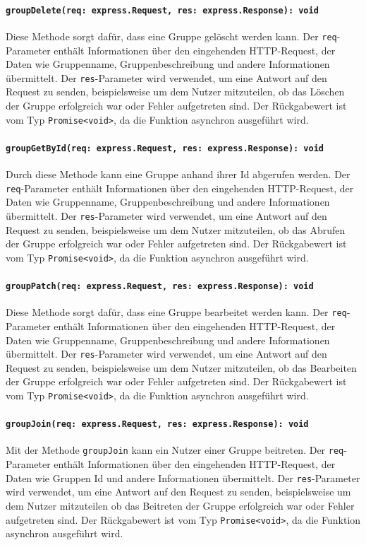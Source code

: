 \documentclass{entwurfsheft}
\begin{document}
\paragraph{\texttt{groupDelete(req: express.Request, res: express.Response): void}}
Diese Methode sorgt dafür, dass eine Gruppe gelöscht werden kann. Der \texttt{req}-Parameter enthält Informationen über den eingehenden HTTP-Request, der Daten wie Gruppenname, Gruppenbeschreibung und andere Informationen übermittelt. Der \texttt{res}-Parameter wird verwendet, um eine Antwort auf den Request zu senden, beispielsweise um dem Nutzer mitzuteilen, ob das Löschen der Gruppe erfolgreich war oder Fehler aufgetreten sind.
Der Rückgabewert ist vom Typ \texttt{Promise<void>}, da die Funktion asynchron ausgeführt wird.
\paragraph{\texttt{groupGetById(req: express.Request, res: express.Response): void}}
Durch diese Methode kann eine Gruppe anhand ihrer Id abgerufen werden. Der \texttt{req}-Parameter enthält Informationen über den eingehenden HTTP-Request, der Daten wie Gruppenname, Gruppenbeschreibung und andere Informationen übermittelt. Der \texttt{res}-Parameter wird verwendet, um eine Antwort auf den Request zu senden, beispielsweise um dem Nutzer mitzuteilen, ob das Abrufen der Gruppe erfolgreich war oder Fehler aufgetreten sind.
Der Rückgabewert ist vom Typ \texttt{Promise<void>}, da die Funktion asynchron ausgeführt wird.
\paragraph{\texttt{groupPatch(req: express.Request, res: express.Response): void}}
Diese Methode sorgt dafür, dass eine Gruppe bearbeitet werden kann. Der \texttt{req}-Parameter enthält Informationen über den eingehenden HTTP-Request, der Daten wie Gruppenname, Gruppenbeschreibung und andere Informationen übermittelt. Der \texttt{res}-Parameter wird verwendet, um eine Antwort auf den Request zu senden, beispielsweise um dem Nutzer mitzuteilen, ob das Bearbeiten der Gruppe erfolgreich war oder Fehler aufgetreten sind.
Der Rückgabewert ist vom Typ \texttt{Promise<void>}, da die Funktion asynchron ausgeführt wird.
\paragraph{\texttt{groupJoin(req: express.Request, res: express.Response): void}}
Mit der Methode \texttt{groupJoin} kann ein Nutzer einer Gruppe beitreten. Der \texttt{req}-Parameter enthält Informationen über den eingehenden HTTP-Request, der Daten wie Gruppen Id und andere Informationen übermittelt. Der \texttt{res}-Parameter wird verwendet, um eine Antwort auf den Request zu senden, beispielsweise um dem Nutzer mitzuteilen ob das Beitreten der Gruppe erfolgreich war oder Fehler aufgetreten sind.
Der Rückgabewert ist vom Typ \texttt{Promise<void>}, da die Funktion asynchron ausgeführt wird.
\end{document}
